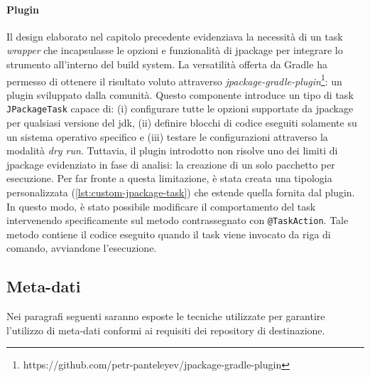 \paragraph{Plugin} Il design elaborato nel capitolo precedente evidenziava la necessità di un task \textit{wrapper} che incapsulasse le opzioni e funzionalità di jpackage per integrare lo strumento all'interno del build system. La versatilità offerta da Gradle ha permesso di ottenere il risultato voluto attraverso \textit{jpackage-gradle-plugin}\footnote{https://github.com/petr-panteleyev/jpackage-gradle-plugin}: un plugin sviluppato dalla comunità. Questo componente introduce un tipo di task \texttt{JPackageTask} capace di: (i) configurare tutte le opzioni supportate da jpackage per qualsiasi versione del \ac{jdk}, (ii) definire blocchi di codice eseguiti solamente su un sistema operativo specifico e (iii) testare le configurazioni attraverso la modalità \textit{dry run}. Tuttavia, il plugin introdotto non risolve uno dei limiti di jpackage evidenziato in fase di analisi: la creazione di un solo pacchetto per esecuzione. Per far fronte a questa limitazione, è stata creata una tipologia personalizzata (\cref{lst:custom-jpackage-task}) che estende quella fornita dal plugin. In questo modo, è stato possibile modificare il comportamento del task intervenendo specificamente sul metodo contrassegnato con \texttt{@TaskAction}. Tale metodo contiene il codice eseguito quando il task viene invocato da riga di comando, avviandone l'esecuzione. 



\subsection{Meta-dati}

Nei paragrafi seguenti saranno esposte le tecniche utilizzate per garantire l'utilizzo di meta-dati conformi ai requisiti dei repository di destinazione.

